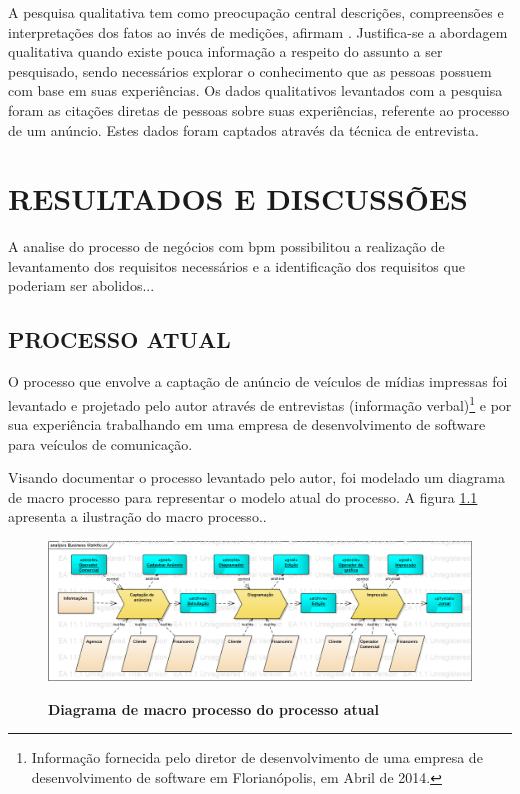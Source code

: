 \documentclass[
	12pt,				%
	openright,			%
	oneside,			%
	a4paper,			%
	chapter=TITLE,		%
	section=TITLE,		%
	english,			%
	french,				%
	spanish,			%
	brazil				%
	]{abntex2}
\begin{document}
A pesquisa qualitativa tem como preocupação central descrições, compreensões e interpretações dos fatos ao invés de medições, afirmam . Justifica-se a abordagem qualitativa quando existe pouca informação a respeito do assunto a ser pesquisado, sendo necessários explorar o conhecimento que as pessoas possuem com base em suas experiências. Os dados qualitativos levantados com a pesquisa foram as citações diretas de pessoas sobre suas experiências, referente ao processo de um anúncio. Estes dados foram captados através da técnica de entrevista.


\chapter{RESULTADOS E DISCUSSÕES}

A analise do processo de negócios com bpm possibilitou a realização de levantamento dos requisitos necessários e a identificação dos requisitos que poderiam ser abolidos...

\section{PROCESSO ATUAL}
O processo que envolve a captação de anúncio de veículos de mídias impressas foi levantado e projetado pelo autor através de entrevistas (informação verbal)\footnote{Informação fornecida pelo diretor de desenvolvimento de uma empresa de desenvolvimento de software em Florianópolis, em Abril de 2014.} e por sua experiência trabalhando em uma empresa de desenvolvimento de software para veículos de comunicação.

Visando documentar o processo levantado pelo autor, foi modelado um diagrama de macro processo para representar o modelo atual do processo. A figura \ref{fig-diag-macroprocesso} apresenta a ilustração do macro processo..

\begin{figure}[htb]
	\begin{center}
		\caption{
			\textbf{Diagrama de macro processo do processo atual}
		}\label{fig-diag-macroprocesso}
		\includegraphics [scale=0.4]{imagens/diagrama_macro_processo.png}
		\label{fig-diag-macroprocesso}
	\end{center}
\end{figure}
\end{document}
